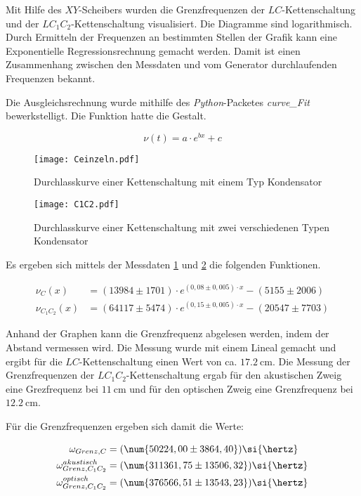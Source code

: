 Mit Hilfe des $XY$-Scheibers wurden die Grenzfrequenzen der $LC$-Kettenschaltung
und der $LC_1C_2$-Kettenschaltung visualisiert. Die Diagramme sind
logarithmisch. Durch Ermitteln der Frequenzen an bestimmten Stellen der
Grafik kann eine Exponentielle Regressionsrechnung gemacht werden.
Damit ist einen Zusammenhang zwischen den Messdaten und vom Generator durchlaufenden
Frequenzen bekannt.

Die Ausgleichsrechnung wurde mithilfe des \emph{Python}-Packetes
\emph{curve\_Fit} bewerkstelligt. Die Funktion hatte die Gestalt.

\begin{equation}
  \nu(t) = a\cdot e^{bx}+c
\end{equation}

\begin{figure}
  \texttt{[image: Ceinzeln.pdf]}
  \caption{Durchlasskurve einer Kettenschaltung mit einem Typ Kondensator}
  \label{fig:Ceinzeln}
\end{figure}

\begin{figure}
  \texttt{[image: C1C2.pdf]}
  \caption{Durchlasskurve einer Kettenschaltung mit zwei verschiedenen Typen Kondensator}
  \label{fig:C1C2}
\end{figure}

Es ergeben sich mittels der Messdaten \ref{fig:Ceinzeln} und \ref{fig:C1C2}
die folgenden Funktionen.

\begin{align}
  \label{eqn:Ausgleichsrechnung_exp_1}
  \nu_{C}(x) &= (13984\pm 1701)\cdot e^{(0,08\pm 0,005)\cdot x} - (5155\pm 2006) \\
  \label{eqn:Ausgleichsrechnung_exp_2}
  \nu_{C_1C_2}(x) &= (64117\pm 5474)\cdot e^{(0,15\pm 0,005)\cdot x}-(20547\pm 7703)
\end{align}

Anhand der Graphen kann die Grenzfrequenz abgelesen werden, indem der
Abstand vermessen wird. Die Messung wurde mit einem Lineal gemacht
und ergibt für die $LC$-Kettenschaltung einen Wert von ca.
$\SI{17,2}{\centi\meter}$. Die Messung der Grenzfrequenzen der
$LC_1C_2$-Kettenschaltung ergab für den akustischen Zweig eine
Grezfrequenz bei $\SI{11}{\centi\meter}$ und für den optischen Zweig eine
Grenzfrequenz bei  $\SI{12,2}{\centi\meter}$.

Für die Grenzfrequenzen ergeben sich damit die Werte:

\begin{align}
  \omega_{Grenz,C} &= (\num{50224,00\pm 3864,40})\si{\hertz}\\
  \omega_{Grenz,C_1C_2}^{akustisch} &= (\num{311361,75\pm 13506,32})\si{\hertz}\\
  \omega_{Grenz,C_1C_2}^{optisch} &= (\num{376566,51\pm 13543,23})\si{\hertz}
\end{align}

